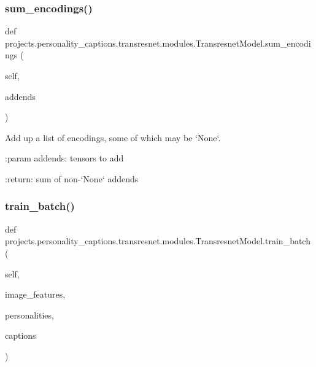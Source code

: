 \subsubsection{\texorpdfstring{sum\+\_\+encodings()}{sum\_encodings()}}
{\footnotesize\ttfamily def projects.\+personality\+\_\+captions.\+transresnet.\+modules.\+Transresnet\+Model.\+sum\+\_\+encodings (\begin{DoxyParamCaption}\item[{}]{self,  }\item[{}]{addends }\end{DoxyParamCaption})}

\begin{DoxyVerb}Add up a list of encodings, some of which may be `None`.

:param addends:
    tensors to add

:return:
    sum of non-`None` addends
\end{DoxyVerb}
 \mbox{\label{classprojects_1_1personality__captions_1_1transresnet_1_1modules_1_1TransresnetModel_a65f01ee6cdfb2d516e1e9be77e3d141a}} 
\subsubsection{\texorpdfstring{train\+\_\+batch()}{train\_batch()}}
{\footnotesize\ttfamily def projects.\+personality\+\_\+captions.\+transresnet.\+modules.\+Transresnet\+Model.\+train\+\_\+batch (\begin{DoxyParamCaption}\item[{}]{self,  }\item[{}]{image\+\_\+features,  }\item[{}]{personalities,  }\item[{}]{captions }\end{DoxyParamCaption})}

